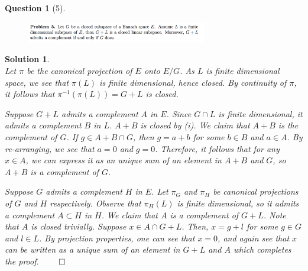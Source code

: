\documentclass{article} %
\theoremstyle{quest}
\newtheorem*{question}{Question}
\newtheorem*{solution}{Solution}
\begin{document}
\begin{question}[5]
\hfill
\begin{figure}[h!]
  \centering
    \includegraphics[width=0.7\textwidth]{funcA-h-e2-p5.png}
\end{figure}
\end{question}
\begin{solution} \hfill \\
Let $\pi$ be the canonical projection of $E$ onto $E / G$. As $L$
is finite dimensional space, we see that $\pi(L)$ is finite dimensional, hence
closed.  
By continuity of $\pi$, it follows that $\pi^{-1}(\pi(L)) = G + L$ is closed.

\bigskip

Suppose $G+L$ admits a complement $A$ in $E$. Since $G \cap L$ is finite dimensional,
it admits a complement $B$ in $L$. $A+B$ is closed by (i). 
We claim that $A +B$ is the complement of $G$. If $g \in A+B \cap G$, then
$g = a+b$ for some $b \in B$ and $a \in A$. By re-arranging, we see that 
$a = 0$ and $g = 0$. Therefore, it follows that for any $x \in A$, we can express it
as an unique sum of an element in $A+B$ and $G$, so $A+B$ is a complement of $G$.



\bigskip

Suppose $G$ admits a complement $H$ in $E$. Let $\pi_G$ and $\pi_H$ be canonical  
projections of $G$ and $H$ respectively. Observe that
$\pi_H(L)$ is finite dimensional, so it admits a complement $A \subset H$
in $H$. We claim that $A$ is a complement of $G + L$. Note that $A$ is closed
trivially. Suppose $x \in A \cap G+L$. Then, $x = g+l$ for some $g \in G$ 
and $l \in L$. By projection properties, one can see that $x = 0$, and again 
see that $x$ can be written as a unique sum of an element in $G+L$ and $A$
which completes the proof. \hfill $\qed$


\end{solution}

\newpage
\end{document}
